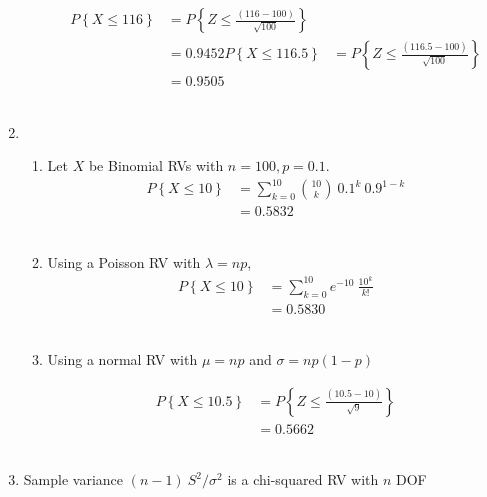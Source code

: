 \begin{enumerate}
\begin{enumerate}
			\begin{align}
				P \left\{X \leq 116 \right\} &= P \left\{ Z \leq \frac{(116 - 100)}{\sqrt{100}} \right\} \nonumber \\
				&= 0.9452
				P \left\{X \leq 116.5 \right\} &= P \left\{ Z \leq \frac{(116.5 - 100)}{\sqrt{100}} \right\} \nonumber \\
				&= 0.9505
			\end{align} \\
		\end{enumerate}
	
	
	\item
	
		\begin{enumerate}
			\item Let $ X $ be Binomial RVs with  $ n = 100, p = 0.1 $.\\
			
			\begin{align}
				P \left\{X \leq 10 \right\} &= \sum\limits_{k=0}^{10} \binom{10}{k}\ 0.1^k\ 0.9^{1-k} \nonumber \\
				&= 0.5832
			\end{align} \\
			
			\item Using a Poisson RV with $ \lambda = np $,\\
			
			\begin{align}
				P \left\{X \leq 10 \right\} &= \sum\limits_{k=0}^{10} e^{-10}\ \frac{10^k}{k!} \nonumber \\
				&= 0.5830
			\end{align} \\
			
			\item Using a normal RV with $ \mu = np$ and $ \sigma = np(1-p) $
			
			\begin{align}
				P \left\{X \leq 10.5 \right\} &= P \left\{ Z \leq \frac{(10.5 - 10)}{\sqrt{9}} \right\} \nonumber \\
				&= 0.5662
			\end{align} \\
		\end{enumerate}
	
	
	\item Sample variance $ (n-1)\ S^2 / \sigma^2 $ is a chi-squared RV with $ n $ DOF \\
	

\end{enumerate}
